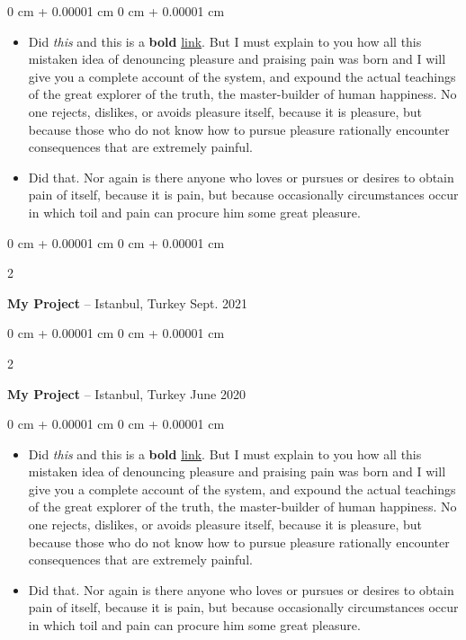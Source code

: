 \documentclass[10pt, letterpaper]{article}
\newenvironment{highlights}{
    \begin{itemize}[
        topsep=0.10 cm,
        parsep=0.10 cm,
        partopsep=0pt,
        itemsep=0pt,
        leftmargin=0 cm + 10pt
    ]
}{
    \end{itemize}
} %
\newenvironment{onecolentry}{
    \begin{adjustwidth}{
        0 cm + 0.00001 cm
    }{
        0 cm + 0.00001 cm
    }
}{
    \end{adjustwidth}
} %
\newenvironment{twocolentry}[2][]{
    \onecolentry
    \def\secondColumn{#2}
    \setcolumnwidth{\fill, 4.5 cm}
    \begin{paracol}{2}
}{
    \switchcolumn \raggedleft \secondColumn
    \end{paracol}
    \endonecolentry
} %
\begin{document}
        \vspace{0.10 cm}
        \begin{onecolentry}
            \begin{highlights}
                \item Did \textit{this} and this is a \textbf{bold} \href{https://example.com}{link}. But I must explain to you how all this mistaken idea of denouncing pleasure and praising pain was born and I will give you a complete account of the system, and expound the actual teachings of the great explorer of the truth, the master-builder of human happiness. No one rejects, dislikes, or avoids pleasure itself, because it is pleasure, but because those who do not know how to pursue pleasure rationally encounter consequences that are extremely painful.
                \item Did that. Nor again is there anyone who loves or pursues or desires to obtain pain of itself, because it is pain, but because occasionally circumstances occur in which toil and pain can procure him some great pleasure.
            \end{highlights}
        \end{onecolentry}


        \vspace{0.2 cm}

        \begin{twocolentry}{
            Sept. 2021
        }
            \textbf{My Project} -- Istanbul, Turkey\end{twocolentry}



        \vspace{0.2 cm}

        \begin{twocolentry}{
            June 2020
        }
            \textbf{My Project} -- Istanbul, Turkey\end{twocolentry}

        \vspace{0.10 cm}
        \begin{onecolentry}
            \begin{highlights}
                \item Did \textit{this} and this is a \textbf{bold} \href{https://example.com}{link}. But I must explain to you how all this mistaken idea of denouncing pleasure and praising pain was born and I will give you a complete account of the system, and expound the actual teachings of the great explorer of the truth, the master-builder of human happiness. No one rejects, dislikes, or avoids pleasure itself, because it is pleasure, but because those who do not know how to pursue pleasure rationally encounter consequences that are extremely painful.
                \item Did that. Nor again is there anyone who loves or pursues or desires to obtain pain of itself, because it is pain, but because occasionally circumstances occur in which toil and pain can procure him some great pleasure.
            \end{highlights}
        \end{onecolentry}
\end{document}

